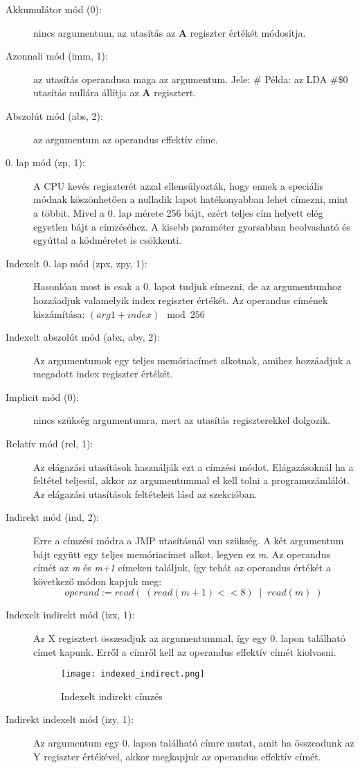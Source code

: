 \begin{description}
	\item[Akkumulátor mód (0):] nincs argumentum, az utasítás az \textbf{A} regiszter értékét módosítja.
	\item[Azonnali mód (imm, 1):] az utasítás operandusa maga az argumentum. Jele: \#
	\newline
	Példa: az LDA \#\$0 utasítás nullára állítja az \textbf{A} regisztert.
	\item[Abszolút mód (abs, 2):] az argumentum az operandus effektív címe.
	\item[0. lap mód (zp, 1):] A CPU kevés regiszterét azzal ellensúlyozták, hogy ennek a speciális módnak köszönhetően a nulladik lapot hatékonyabban lehet címezni, mint a többit. 
	Mivel a 0. lap mérete 256 bájt, ezért teljes cím helyett elég egyetlen bájt a címzéséhez.
	A kisebb paraméter gyorsabban beolvasható és egyúttal a kódméretet is csökkenti.
	\item[Indexelt 0. lap mód (zpx, zpy, 1):]
	Hasonlóan most is csak a 0. lapot tudjuk címezni, de az argumentumhoz hozzáadjuk valamelyik index regiszter értékét.
	Az operandus címének kiszámítása: $ (arg1 + index) \mod 256 $
	\item[Indexelt abszolút mód (abx, aby, 2):] Az argumentumok egy teljes memóriacímet alkotnak, amihez hozzáadjuk a megadott index regiszter értékét. 
	\item[Implicit mód (0):] nincs szükség argumentumra, mert az utasítás regiszterekkel dolgozik.
	\item[Relatív mód (rel, 1):] Az elágazási utasítások használják ezt a címzési módot. Elágazásoknál ha a feltétel teljesül, akkor az argumentummal el kell tolni a programszámlálót. Az elágazási utasítások feltételeit lásd az \emph{} szekcióban.
	\item[Indirekt mód (ind, 2):] 
	Erre a címzési módra a JMP utasításnál van szükség.
	A két argumentum bájt együtt egy teljes memóriacímet alkot, legyen ez \emph{m}.
	Az operandus címét az \emph{m} és \emph{m+1} címeken találjuk, így tehát az operandus értékét a következő módon kapjuk meg: $$ operand := read(\;(read(m+1) << 8) \;\; | \;\; read(m)\;) $$
	\item[Indexelt indirekt mód (izx, 1):]
	Az X regisztert összeadjuk az argumentummal, így egy 0. lapon található címet kapunk.
	Erről a címről kell az operandus effektív címét kiolvasni.
	\begin{figure}[H]
		\centering
		\vspace{0.4cm}
		\texttt{[image: indexed\_indirect.png]}
		\caption{Indexelt indirekt címzés}
	\end{figure}
	\item[Indirekt indexelt mód (izy, 1):]
	Az argumentum egy 0. lapon található címre mutat, amit ha összeadunk az Y regiszter értékével, akkor megkapjuk az operandus effektív címét. 
	
	
	
\end{description}

